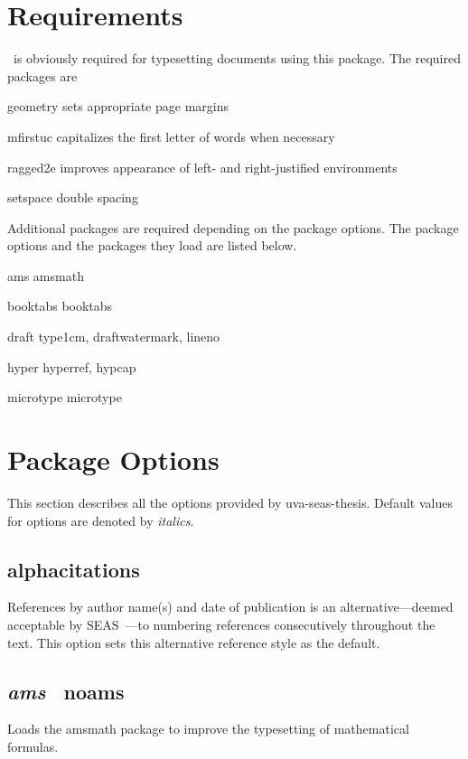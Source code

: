 \documentclass[10pt]{article}
\newcommand{\package}[1]{#1}
\newcommand{\option}[1]{#1}
\newcommand{\default}[1]{\emph{#1}}
\newcommand{\thispackage}{\package{uva-seas-thesis}}
\begin{document}
\section{Requirements}\label{section:requirements}
\LaTeXe\ is obviously required for typesetting documents using this package.
The required packages are
\begin{description*}
  \item[\package{geometry}] sets appropriate page margins
  \item[\package{mfirstuc}] capitalizes the first letter of words when necessary
  \item[\package{ragged2e}] improves appearance of left- and right-justified environments
  \item[\package{setspace}] double spacing
\end{description*}
Additional packages are required depending on the package options.
The package options and the packages they load are listed below.
\begin{description*}
  \item[\option{ams}] \package{amsmath}
  \item[\option{booktabs}] \package{booktabs}
  \item[\option{draft}] \package{type1cm}, \package{draftwatermark}, \package{lineno}
  \item[\option{hyper}] \package{hyperref}, \package{hypcap}
  \item[\option{microtype}] \package{microtype}
\end{description*}

\section{Package Options}\label{section:options}
This section describes all the options provided by \thispackage.
Default values for options are denoted by \default{italics}.

\subsection{\option{alphacitations}}
References by author name(s) and date of publication is an alternative---deemed acceptable by \gls{SEAS}~\cite{seas:instructions}---to numbering references consecutively throughout the text.
This option sets this alternative reference style as the default.

\subsection{\default{\option{ams}} \textbar\ \option{noams}}
Loads the \package{amsmath} package to improve the typesetting of mathematical formulas.
\end{document}
